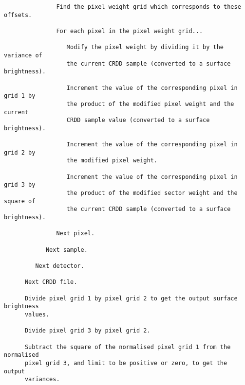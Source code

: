 \begin{verbatim}
               Find the pixel weight grid which corresponds to these offsets.

               For each pixel in the pixel weight grid...

                  Modify the pixel weight by dividing it by the variance of
                  the current CRDD sample (converted to a surface brightness).

                  Increment the value of the corresponding pixel in grid 1 by 
                  the product of the modified pixel weight and the current 
                  CRDD sample value (converted to a surface brightness).

                  Increment the value of the corresponding pixel in grid 2 by 
                  the modified pixel weight.

                  Increment the value of the corresponding pixel in grid 3 by 
                  the product of the modified sector weight and the square of 
                  the current CRDD sample (converted to a surface brightness).

               Next pixel.

            Next sample.

         Next detector.

      Next CRDD file.

      Divide pixel grid 1 by pixel grid 2 to get the output surface brightness
      values.

      Divide pixel grid 3 by pixel grid 2.

      Subtract the square of the normalised pixel grid 1 from the normalised 
      pixel grid 3, and limit to be positive or zero, to get the output 
      variances.

\end{verbatim}

